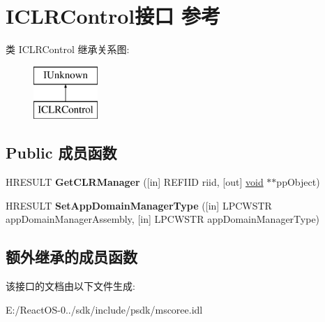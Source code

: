 \hypertarget{interface_i_c_l_r_control}{}\section{I\+C\+L\+R\+Control接口 参考}
\label{interface_i_c_l_r_control}
类 I\+C\+L\+R\+Control 继承关系图\+:\begin{figure}[H]
\begin{center}
\leavevmode
\includegraphics[height=2.000000cm]{interface_i_c_l_r_control}
\end{center}
\end{figure}
\subsection*{Public 成员函数}
\begin{DoxyCompactItemize}
\item 
\mbox{\label{interface_i_c_l_r_control_a24ea56837f27d00263741888b06f9301}} 
H\+R\+E\+S\+U\+LT {\bfseries Get\+C\+L\+R\+Manager} (\mbox{[}in\mbox{]} R\+E\+F\+I\+ID riid, \mbox{[}out\mbox{]} \hyperlink{interfacevoid}{void} $\ast$$\ast$pp\+Object)
\item 
\mbox{\label{interface_i_c_l_r_control_ab87c57e3e87ae23aa09d0dcfb1e4cc39}} 
H\+R\+E\+S\+U\+LT {\bfseries Set\+App\+Domain\+Manager\+Type} (\mbox{[}in\mbox{]} L\+P\+C\+W\+S\+TR app\+Domain\+Manager\+Assembly, \mbox{[}in\mbox{]} L\+P\+C\+W\+S\+TR app\+Domain\+Manager\+Type)
\end{DoxyCompactItemize}
\subsection*{额外继承的成员函数}


该接口的文档由以下文件生成\+:\begin{DoxyCompactItemize}
\item 
E\+:/\+React\+O\+S-\/0../sdk/include/psdk/mscoree.\+idl\end{DoxyCompactItemize}
